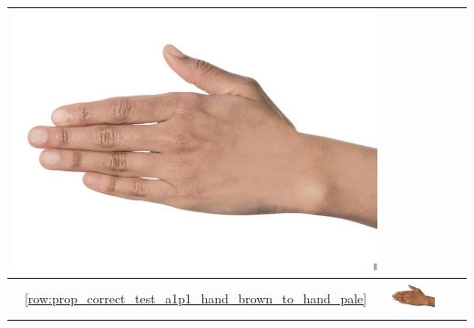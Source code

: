 \begin{longtable}{|c||c|c|c|}
\begin{minipage}{.29\textwidth}
    \includegraphics[width=\textwidth,height=\textheight,keepaspectratio]{../rc_test/outputs/20170522_proportional_corrected_test_alpha1p1/hand_brown_to_hand_light.jpg}
  \end{minipage} \\
  \hline  \ref{row:prop_correct_test_a1p1_hand_brown_to_hand_pale} &
  \begin{minipage}{.29\textwidth}
    \includegraphics[width=\textwidth,height=\textheight,keepaspectratio]{../inputs/hand_brown.jpg}
  \end{minipage} & 
  \begin{minipage}{.29\textwidth}

\end{minipage}
\end{longtable}
